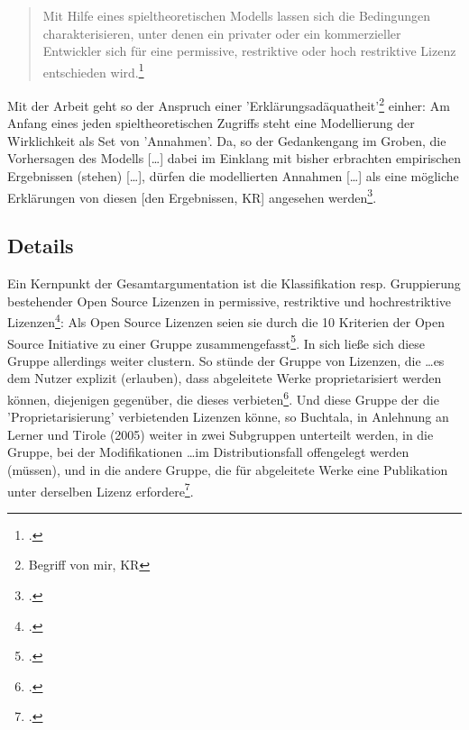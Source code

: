 \documentclass[DIV=calc,BCOR=5mm,11pt,headings=small,oneside,abstract=true, toc=bib]{scrartcl}
\begin{document}
\begin{quotation}\noindent\glqq{}Mit Hilfe eines spieltheoretischen Modells lassen
sich die Bedingungen charakterisieren, unter denen ein privater oder ein kommerzieller
Entwickler sich für eine permissive, restriktive oder hoch restriktive Lizenz
entschieden wird.\grqq{}\footcite[][26]{Buchtala2007a}
\end{quotation}

Mit der Arbeit geht so der Anspruch einer
'Erklärungsadäquatheit'\footnote{Begriff von mir, KR} einher: Am Anfang eines
jeden spieltheoretischen Zugriffs steht eine Modellierung der Wirklichkeit als Set von 'Annahmen'. Da, so der Gedankengang im Groben,
\glqq{}die Vorhersagen des Modells [\ldots] dabei im Einklang mit bisher
erbrachten empirischen Ergebnissen (stehen) [\ldots]\grqq{}, dürfen die
modellierten Annahmen \glqq{}[\ldots] als eine mögliche Erklärungen von diesen
[den Ergebnissen, KR] angesehen werden\grqq{}\footcite[][26]{Buchtala2007a}.

\subsection{Details}

Ein Kernpunkt der Gesamtargumentation ist die Klassifikation resp. Gruppierung
bestehender Open Source Lizenzen in \glqq{}permissive, restriktive und
hochrestriktive Lizenzen\grqq{}\footcite[cf.][55]{Buchtala2007a}: Als Open
Source Lizenzen seien sie durch die 10 Kriterien der Open Source Initiative zu
einer Gruppe zusammengefasst\footcite[cf.][53ff]{Buchtala2007a}. In sich
ließe sich diese Gruppe allerdings weiter clustern. So stünde der Gruppe von
Lizenzen, die \glqq{}\ldots es dem Nutzer explizit (erlauben), dass abgeleitete
Werke proprietarisiert werden können\grqq{}, diejenigen gegenüber, die dieses
verbieten\footcite[cf.][55]{Buchtala2007a}. Und diese Gruppe der die
'Proprietarisierung' verbietenden Lizenzen könne, so Buchtala, in Anlehnung an
\glqq{}Lerner und Tirole (2005)\grqq{} weiter in zwei Subgruppen unterteilt
werden, in die Gruppe, bei der \glqq{}Modifikationen \ldots im Distributionsfall
offengelegt werden (müssen)\grqq{}, und in die andere Gruppe, die für
abgeleitete Werke eine Publikation \glqq{}unter derselben Lizenz\grqq{}
erfordere\footcite[cf.][56]{Buchtala2007a}.
\end{document}
